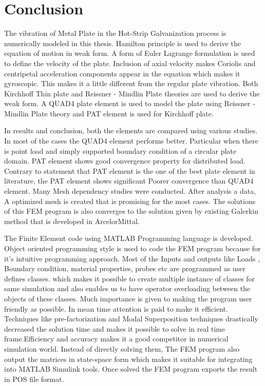\documentclass[main.tex]{subfiles}
\begin{document}
\chapter{Conclusion}

The vibration of Metal Plate in the Hot-Strip Galvanization process is numerically modeled in this thesis. Hamilton principle is used to derive the equation of motion in weak form. A form of Euler Lagrange formulation is used to define the velocity of the plate. Inclusion of axial velocity makes Coriolis and centripetal acceleration components appear in the equation which makes it gyroscopic.  This makes it a little different from the regular plate vibration. Both Kirchhoff Thin plate and Reissner - Mindlin Plate theories are used to derive the weak form. A QUAD4 plate element is used to model the plate using Reissner - Mindlin Plate theory and PAT element is used for Kirchhoff plate. 

In results and conclusion, both the elements are compared using various studies. In most of the cases the QUAD4 element performs better. Particular when there is point load and simply supported boundary condition of a circular plate domain. PAT element shows good convergence property for distributed load.  Contrary to statement that PAT element is the one of the best plate element in literature, the PAT element shows significant Poorer convergence than QUAD4 element. Many Mesh dependency studies were conducted. After analysis a data, A optimized mesh is created that is promising for the most cases. The solutions of this FEM program is also converges to the solution given by existing Galerkin method that is developed in ArcelorMittal. 

The  Finite Element code using MATLAB Programming language is developed. Object oriented programming style is used to code the FEM program because for it's intuitive programming approach. Most of the Inputs and outputs like Loads , Boundary condition, material properties, probes etc are programmed as user defines classes. which makes it possible to create multiple instance of classes for same simulation and also enables us to have operator overloading between the objects of these classes. Much importance is given to making the program user friendly as possible. In mean time attention is paid to make it efficient. Techniques like pre-factorization and Modal Superposition techniques drastically decreased the solution time and makes it possible to solve in real time frame.Efficiency and accuracy makes it a good competitor in numerical simulation world. Instead of directly solving them, The FEM program also output the matrices in state-space form which makes it suitable for integrating into MATLAB Simulink tools. Once solved the FEM program exports the result in POS file format.
\end{document}
